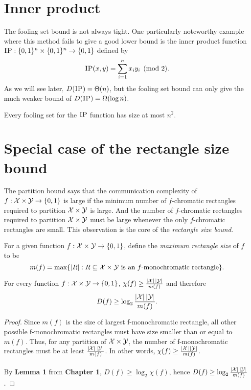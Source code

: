 \section{Inner product}

The fooling set bound is not always tight. One particularly noteworthy example where this method fails to give a good lower bound is the inner product function  $\textsc{IP} : \{0,1\}^n \times \{0,1\}^n \to \{0,1\}$ defined by
\[
\textsc{IP}(x,y) = \sum_{i=1}^n x_i y_i \pmod{2}.
\]
As we will see later, $D(\textsc{IP}) = \Theta(n)$, but the fooling set bound can only give the much weaker bound of $D(\textsc{IP}) = \Omega(\log n)$.

\begin{theorem}
	Every fooling set for the $\textsc{IP}$ function has size at most $n^2$.
\end{theorem}



\section{Special case of the rectangle size bound}

The partition bound says that the communication complexity of $f : \mathcal{X} \times \mathcal{Y} \to \{0,1\}$ is large if the minimum number of $f$-chromatic rectangles required to partition $\mathcal{X} \times \mathcal{Y}$ is large. And the number of $f$-chromatic rectangles required to partition $\mathcal{X} \times \mathcal{Y}$ must be large whenever the only $f$-chromatic rectangles are small. This observation is the core of the \emph{rectangle size bound}.

\begin{definition}[$m(f)$]
	For a given function $f : \mathcal{X} \times \mathcal{Y} \to \{0,1\}$, define the \emph{maximum rectangle size} of $f$ to be
	\[
	m(f) = \max \{ |R| : R \subseteq \mathcal{X} \times \mathcal{Y} \mbox{ is an $f$-monochromatic rectangle} \}.
	\]
\end{definition}


\begin{lemma}
	For every function $f : \mathcal{X} \times \mathcal{Y} \to \{0,1\}$, $\chi(f) \ge \frac{|\mathcal{X}| \, |\mathcal{Y}|}{m(f)}$ and therefore
	\[
	D(f) \ge \log_2 \frac{|\mathcal{X}| \, |\mathcal{Y}|}{m(f)}.
	\]
\end{lemma}

\begin{proof}
	Since $m(f)$ is the size of largest f-monochromatic rectangle, all other possible f-monochromatic rectangles must have size smaller than or equal to $m(f)$. Thus, for any partition of $\mathcal{X} \times \mathcal{Y}$, the number of f-monochromatic rectangles must be at least $\frac{|\mathcal{X}| \, |\mathcal{Y}|}{m(f)}$. In other words, $\chi(f) \ge \frac{|\mathcal{X}| \, |\mathcal{Y}|}{m(f)}$.\\
	\\
	By \textbf{Lemma 1} from \textbf{Chapter 1}, $D(f) \ge \log_2 \chi(f)$, hence $D(f) \ge \log_2 \frac{|\mathcal{X}| \, |\mathcal{Y}|}{m(f)}$.
\end{proof}



